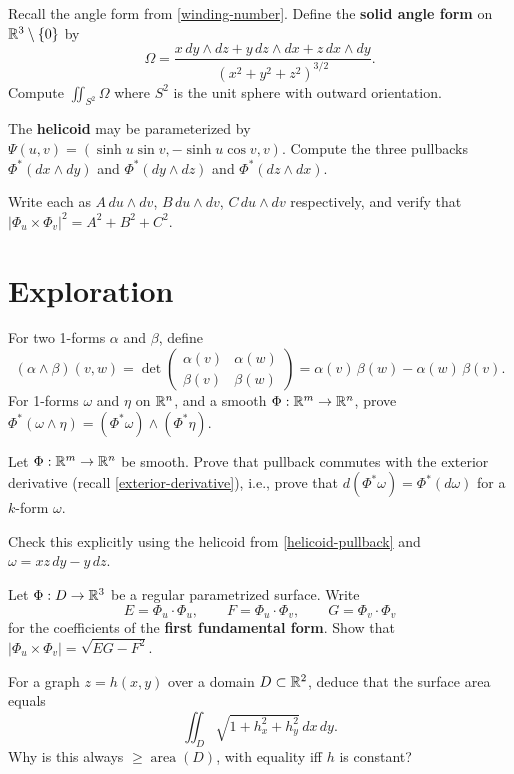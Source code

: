\documentclass{homework}
\begin{document}
\begin{problem}\label{solid-angle-form}%
  Recall the angle form from \ref{winding-number}. Define the \textbf{solid angle form} on $\mathbb{R}^3\setminus\{0\}$ by
  \[
    \Omega = \frac{x\,dy\wedge dz + y\,dz\wedge dx + z\,dx\wedge dy}{(x^2+y^2+z^2)^{3/2}}.
  \]
  Compute $\displaystyle\iint_{S^2}\Omega$ where $S^2$ is the unit sphere with outward orientation.
\end{problem}


\begin{problem}\label{helicoid-pullback}%
  The \textbf{helicoid} may be parameterized by $\Psi(u,v)=(\sinh u \sin v,-\sinh u \cos v,v)$.
  Compute the three pullbacks
  \(\Phi^*(dx\wedge dy)\) and \(\Phi^*(dy\wedge dz)\) and \(\Phi^*(dz\wedge dx)\).
  
  Write each as $A\,du\wedge dv$, $B\,du\wedge dv$, $C\,du\wedge dv$ respectively, and verify that
  $|\Phi_u\times\Phi_v|^2=A^2+B^2+C^2$.
\end{problem}


\section{Exploration}

\begin{problem}\label{pullback-wedge}%
  For two 1-forms $\alpha$ and $\beta$, define
  \[
    (\alpha\wedge\beta)(v,w)
    = \det\begin{pmatrix} \alpha(v) & \alpha(w) \\ \beta(v) & \beta(w) \end{pmatrix}
    = \alpha(v)\,\beta(w) - \alpha(w)\,\beta(v).
  \]
  For 1-forms $\omega$ and $\eta$ on $\mathbb{R}^n$, and a smooth $\Phi:\mathbb{R}^m\to\mathbb{R}^n$, prove
  \(\Phi^*(\omega\wedge\eta)=(\Phi^*\omega)\wedge(\Phi^*\eta)\).
\end{problem}

\begin{problem}\label{pullback-commutes-d}%
  Let $\Phi:\mathbb{R}^m\to\mathbb{R}^n$ be smooth.
  Prove that pullback commutes with the exterior derivative (recall \ref{exterior-derivative}), i.e., prove that \(d(\Phi^*\omega)=\Phi^*(d\omega)\) for a $k$-form $\omega$.

  Check this explicitly using the helicoid from \ref{helicoid-pullback} and
  $\omega=xz\,dy-y\,dz$.
\end{problem}

\begin{problem}\label{first-fundamental-form}%
  Let $\Phi:D\to\mathbb{R}^3$ be a regular parametrized surface.  Write
  \[
    E=\Phi_u\cdot\Phi_u,\qquad F=\Phi_u\cdot\Phi_v,\qquad G=\Phi_v\cdot\Phi_v
  \]
  for the coefficients of the \textbf{first fundamental form}.
  Show that $|\Phi_u\times\Phi_v|=\sqrt{EG-F^2}$.
  
  For a graph $z=h(x,y)$ over a domain $D\subset\mathbb{R}^2$, deduce that the surface area equals
  \[
    \iint_D\sqrt{1+h_x^2+h_y^2}\,dx\,dy.
  \]
  Why is this always $\ge\operatorname{area}(D)$, with equality iff $h$ is constant?
\end{problem}
\end{document}
